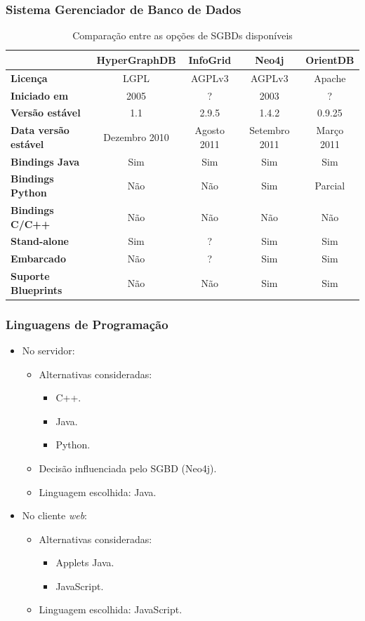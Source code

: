 \frame
{
\frametitle{Sistema Gerenciador de Banco de Dados}
\begin{table}[!htb]
	\centering
	\tiny
	\caption{Comparação entre as opções de SGBDs disponíveis}
	\begin{tabular}{lcccc}
		\hline
		& \textbf{HyperGraphDB} & \textbf{InfoGrid} & \textbf{Neo4j} & \textbf{OrientDB} \\
		\hline
		\textbf{Licença} & LGPL & AGPLv3 & AGPLv3 & Apache \\
		\textbf{Iniciado em} & 2005 & ? & 2003 & ? \\
		\textbf{Versão estável} & 1.1 & 2.9.5 & 1.4.2 & 0.9.25 \\
		\textbf{Data versão estável} & Dezembro 2010 & Agosto 2011 & Setembro 2011 & Março 2011 \\
		\textbf{Bindings Java} & Sim & Sim & Sim & Sim \\
		\textbf{Bindings Python} & Não & Não & Sim & Parcial \\
		\textbf{Bindings C/C++} & Não & Não & Não & Não \\
		\textbf{Stand-alone} & Sim & ? & Sim & Sim \\
		\textbf{Embarcado} & Não & ? & Sim & Sim \\
		\textbf{Suporte Blueprints} & Não & Não & Sim & Sim \\
		\hline
	\end{tabular}
\end{table}
}

\frame
{
\frametitle{Linguagens de Programação}
\begin{itemize}
	\item No servidor:
	\begin{itemize}
		\item Alternativas consideradas:
		\begin{itemize}
			\item C++.
			\item Java.
			\item Python.
		\end{itemize}
		\item Decisão influenciada pelo SGBD (Neo4j).
		\item Linguagem escolhida: Java.
	\end{itemize}
	\item No cliente \emph{web}:
	\begin{itemize}
		\item Alternativas consideradas:
		\begin{itemize}
			\item Applets Java.
			\item JavaScript.
		\end{itemize}
		\item Linguagem escolhida: JavaScript.
	\end{itemize}
\end{itemize}
}

